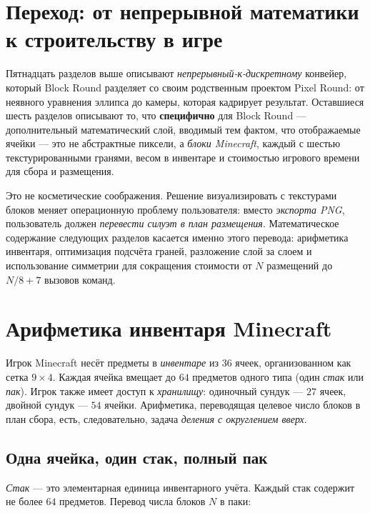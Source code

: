 \documentclass[12pt,a4paper]{scrartcl}
\newcommand{\acc}[1]{\textcolor{accent}{\textbf{#1}}}
\begin{document}
\section{Переход: от непрерывной математики к строительству в игре}

Пятнадцать разделов выше описывают \emph{непрерывный-к-дискретному} конвейер, который Block Round разделяет со своим родственным проектом Pixel Round: от неявного уравнения эллипса до камеры, которая кадрирует результат. Оставшиеся шесть разделов описывают то, что \acc{специфично} для Block Round — дополнительный математический слой, вводимый тем фактом, что отображаемые ячейки — это не абстрактные пиксели, а \emph{блоки Minecraft}, каждый с шестью текстурированными гранями, весом в инвентаре и стоимостью игрового времени для сбора и размещения.

Это не косметические соображения. Решение визуализировать с текстурами блоков меняет операционную проблему пользователя: вместо \emph{экспорта PNG}, пользователь должен \emph{перевести силуэт в план размещения}. Математическое содержание следующих разделов касается именно этого перевода: арифметика инвентаря, оптимизация подсчёта граней, разложение слой за слоем и использование симметрии для сокращения стоимости от $N$ размещений до $N/8 + 7$ вызовов команд.

\clearpage

\section{Арифметика инвентаря Minecraft}

Игрок Minecraft несёт предметы в \emph{инвентаре} из 36 ячеек, организованном как сетка $9 \times 4$. Каждая ячейка вмещает до $64$ предметов одного типа (один \emph{стак} или \emph{пак}). Игрок также имеет доступ к \emph{хранилищу}: одиночный сундук — $27$ ячеек, двойной сундук — $54$ ячейки. Арифметика, переводящая целевое число блоков в план сбора, есть, следовательно, задача \emph{деления с округлением вверх}.

\subsection{Одна ячейка, один стак, полный пак}
\emph{Стак} — это элементарная единица инвентарного учёта. Каждый стак содержит не более $64$ предметов. Перевод числа блоков $N$ в паки:
\end{document}
